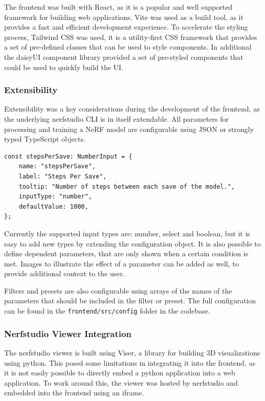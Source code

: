 The frontend was built with React, as it is a popular and well supported framework for building web applications.
Vite was used as a build tool, as it provides a fast and efficient development experience.
To accelerate the styling process, Tailwind CSS was used, it is a utility-first CSS framework that provides a set of pre-defined classes that can be used to style components.
In additional the daisyUI component library provided a set of pre-styled components that could be used to quickly build the UI.

\subsubsection{Extensibility}

Extensibility was a key considerations during the development of the frontend, as the underlying nerfstudio CLI is in itself extendable.
All parameters for processing and training a NeRF model are configurable using JSON or strongly typed TypeScript objects.

\begin{lstlisting}[caption=Parameter Option configuration]
const stepsPerSave: NumberInput = {
	name: "stepsPerSave",
	label: "Steps Per Save",
	tooltip: "Number of steps between each save of the model.",
	inputType: "number",
	defaultValue: 1000,
};
\end{lstlisting}

Currently the supported input types are: number, select and boolean, but it is easy to add new types by extending the configuration object. 
It is also possible to define dependent parameters, that are only shown when a certain condition is met.
Images to illustrate the effect of a parameter can be added as well, to provide additional context to the user.

Filters and presets are also configurable using arrays of the names of the parameters that should be included in the filter or preset.
The full configuration can be found in the \texttt{frontend/src/config} folder in the codebase.

\subsubsection{Nerfstudio Viewer Integration}

The nerfstudio viewer is built using Viser, a library for building 3D visualizations using python.
This posed some limitations in integrating it into the frontend, as it is not easily possible to directly embed a python application into a web application.
To work around this, the viewer was hosted by nerfstudio and embedded into the frontend using an iframe.

